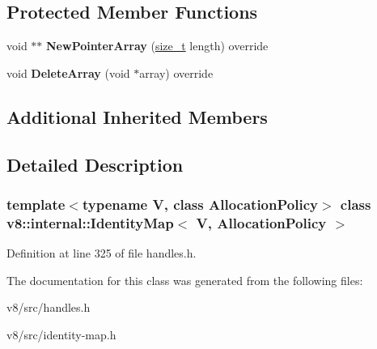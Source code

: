 \subsection*{Protected Member Functions}
\begin{DoxyCompactItemize}
\item 
\mbox{\label{classv8_1_1internal_1_1IdentityMap_add779c6723eef81c5d98c2c34c5f365f}} 
void $\ast$$\ast$ {\bfseries New\+Pointer\+Array} (\mbox{\hyperlink{classsize__t}{size\+\_\+t}} length) override
\item 
\mbox{\label{classv8_1_1internal_1_1IdentityMap_a9898ab3db4e502a60f61e069181dbadd}} 
void {\bfseries Delete\+Array} (void $\ast$array) override
\end{DoxyCompactItemize}
\subsection*{Additional Inherited Members}


\subsection{Detailed Description}
\subsubsection*{template$<$typename V, class Allocation\+Policy$>$\newline
class v8\+::internal\+::\+Identity\+Map$<$ V, Allocation\+Policy $>$}



Definition at line 325 of file handles.\+h.



The documentation for this class was generated from the following files\+:\begin{DoxyCompactItemize}
\item 
v8/src/handles.\+h\item 
v8/src/identity-\/map.\+h\end{DoxyCompactItemize}
